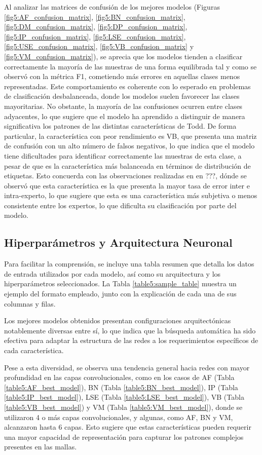 Al analizar las matrices de confusión de los mejores modelos (Figuras \ref{fig5:AF_confusion_matrix}, \ref{fig5:BN_confusion_matrix}, \ref{fig5:DM_confusion_matrix}, \ref{fig5:DP_confusion_matrix}, \ref{fig5:IP_confusion_matrix}, \ref{fig5:LSE_confusion_matrix}, \ref{fig5:USE_confusion_matrix}, \ref{fig5:VB_confusion_matrix} y \ref{fig5:VM_confusion_matrix}), se aprecia que los modelos tienden a clasificar correctamente la mayoría de las muestras de una forma equilibrada tal y como se observó con la métrica F1, cometiendo más errores en aquellas clases menos representadas. Este comportamiento es coherente con lo esperado en problemas de clasificación desbalanceada, donde los modelos suelen favorecer las clases mayoritarias. No obstante, la mayoría de las confusiones ocurren entre clases adyacentes, lo que sugiere que el modelo ha aprendido a distinguir de manera significativa los patrones de las distintas características de Todd. De forma particular, la característica con peor rendimiento es VB, que presenta una matriz de confusión con un alto número de falsos negativos, lo que indica que el modelo tiene dificultades para identificar correctamente las muestras de esta clase, a pesar de que es la característica más balanceada en términos de distribución de etiquetas. Esto concuerda con las observaciones realizadas en en ???, dónde se observó que esta característica es la que presenta la mayor tasa de error inter e intra-experto, lo que sugiere que esta es una característica más subjetiva o menos consistente entre los expertos, lo que dificulta su clasificación por parte del modelo.

\subsection{Hiperparámetros y Arquitectura Neuronal}
Para facilitar la comprensión, se incluye una tabla resumen que detalla los datos de entrada utilizados por cada modelo, así como su arquitectura y los hiperparámetros seleccionados. La Tabla \ref{table5:sample_table} muestra un ejemplo del formato empleado, junto con la explicación de cada una de sus columnas y filas.

Los mejores modelos obtenidos presentan configuraciones arquitectónicas notablemente diversas entre sí, lo que indica que la búsqueda automática ha sido efectiva para adaptar la estructura de las redes a los requerimientos específicos de cada característica.

Pese a esta diversidad, se observa una tendencia general hacia redes con mayor profundidad en las capas convolucionales, como en los casos de AF (Tabla \ref{table5:AF_best_model}), BN (Tabla \ref{table5:BN_best_model}), IP (Tabla \ref{table5:IP_best_model}), LSE (Tabla \ref{table5:LSE_best_model}), VB (Tabla \ref{table5:VB_best_model}) y VM (Tabla \ref{table5:VM_best_model}), donde se utilizaron 4 o más capas convolucionales, y algunas, como AF, BN y VM, alcanzaron hasta 6 capas. Esto sugiere que estas características pueden requerir una mayor capacidad de representación para capturar los patrones complejos presentes en las mallas.

